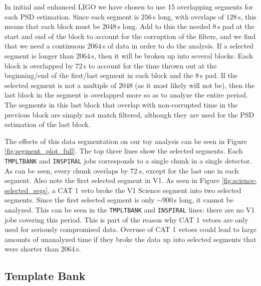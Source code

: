 In initial and enhanced \ac{LIGO} we have chosen to use 15 overlapping segments
for each \ac{PSD} estimation. Since each segment is $256\,$s long, with
overlaps of $128\,$s, this means that each block must be $2048\,$s long. Add to
this the needed $8\,$s pad at the start and end of the block to account for the
corruption of the filters, and we find that we need a continuous $2064\,$s of
data in order to do the analysis. If a selected segment is longer than
$2064\,$s, then it will be broken up into several blocks. Each block is
overlapped by $72\,$s to account for the time thrown out at the beginning/end
of the first/last segment in each block and the $8\,$s pad. If the selected
segment is not a multiple of $2048$ (as it most likely will not be), then the
last block in the segment is overlapped more so as to analyze the entire
period. The segments in this last block that overlap with non-corrupted time in
the previous block are simply not match filtered, although they are used for
the \ac{PSD} estimation of the last block.

The effects of this data segmentation on our toy analysis can be seen in Figure
\ref{fig:segment_plot_full}. The top three lines show the selected segments.
Each \texttt{TMPLTBANK} and \texttt{INSPIRAL} jobs corresponds to a single
chunk in a single detector. As can be seen, every chunk overlaps by $72\,s$,
except for the last one in each segment. Also note the first selected segment
in V1. As seen in Figure \ref{fig:science-selected_segs}, a CAT 1 veto broke
the V1 Science segment into two selected segments. Since the first selected
segment is only $\sim900\,$s long, it cannot be analyzed. This can be seen in
the \texttt{TMPLTBANK} and \texttt{INSPIRAL} lines: there are no V1 jobs
covering this period. This is part of the reason why CAT 1 vetoes are only used
for seriously compromised data. Overuse of CAT 1 vetoes could lead to large
amounts of unanalyzed time if they broke the data up into selected segments
that were shorter than $2064\,$s.

\subsection{Template Bank}
\label{sec:tmpltbank}

